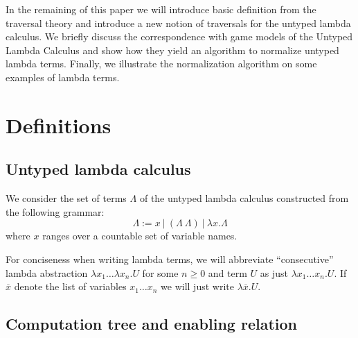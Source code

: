 \documentclass{article}
\theoremstyle{definition}
\begin{document}
In the remaining of this paper we will introduce basic definition from the traversal theory and introduce a new notion of traversals for the untyped lambda calculus. We briefly discuss the correspondence with game models of the Untyped Lambda Calculus \cite{KerThesis} and show how they yield an algorithm to normalize untyped lambda terms. Finally, we illustrate the normalization algorithm on some examples of lambda terms.

\section{Definitions}

\subsection{Untyped lambda calculus}

We consider the set of terms $\Lambda$ of the untyped lambda calculus constructed from the following grammar:
$$\Lambda := x\ |\ (\Lambda\ \Lambda)\ |\ \lambda x. \Lambda $$
where $x$ ranges over a countable set of variable names.

For conciseness when writing lambda terms, we will abbreviate ``consecutive'' lambda abstraction $\lambda x_1 \ldots \lambda x_n . U$ for some $n\geq 0$ and term $U$ as just
$\lambda x_1 \ldots x_n . U$. If $\overline{x}$ denote the list of variables $x_1 \ldots x_n$ we will just write $\lambda \overline{x} . U$.

\subsection{Computation tree and enabling relation}
\end{document}
